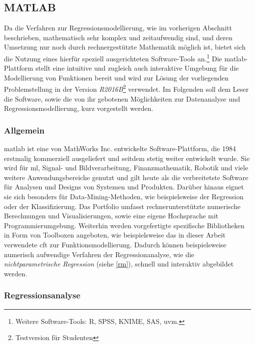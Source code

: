 \subsection{MATLAB}
\label{matlab}

Da die Verfahren zur Regressionsmodellierung, wie im vorherigen Abschnitt beschrieben, mathematisch sehr komplex und zeitaufwendig sind, und deren Umsetzung nur noch durch rechnergestützte Mathematik möglich ist, bietet sich die Nutzung eines hierfür speziell ausgerichteten Software-Tools an.\footnote{Weitere Software-Tools: R, SPSS, KNIME, SAS, uvm.} Die \gls{matlab}-Plattform stellt eine intuitive und zugleich auch interaktive Umgebung für die Modellierung von Funktionen bereit und wird zur Lösung der vorliegenden Problemstellung in der Version \textit{R2016B}\footnote{Testversion für Studenten} verwendet. Im Folgenden soll dem Leser die Software, sowie die von ihr gebotenen Möglichkeiten zur Datenanalyse und Regressionsmodellierung, kurz vorgestellt werden. 

\subsubsection{Allgemein}
\gls{matlab} ist eine von MathWorks Inc. entwickelte Software-Plattform, die 1984 erstmalig kommerziell ausgeliefert und seitdem stetig weiter entwickelt wurde. Sie wird für \gls{ml}, Signal- und Bildverarbeitung, Finanzmathematik, Robotik und viele weitere Anwendungsbereiche genutzt und gilt heute als die verbreitetste Software für Analysen und Designs von Systemen und Produkten. Darüber hinaus eignet sie sich besonders für Data-Mining-Methoden, wie beispielsweise der Regression oder der Klassifizierung. Das Portfolio umfasst rechnerunterstützte numerische Berechnungen und Visualisierungen, sowie eine eigene Hochsprache mit Programmierumgebung. Weiterhin werden vorgefertigte spezifische Bibliotheken in Form von Toolboxen angeboten, wie beispielsweise das in dieser Arbeit verwendete \gls{cft} zur Funktionsmodellierung. Dadurch können beispielsweise numerisch aufwendige Verfahren der Regressionanalyse, wie die \textit{nichtparametrische Regression} (siehe \vref{rm}), schnell und interaktiv abgebildet werden. 

\subsubsection{Regressionsanalyse}
\label{matra}

